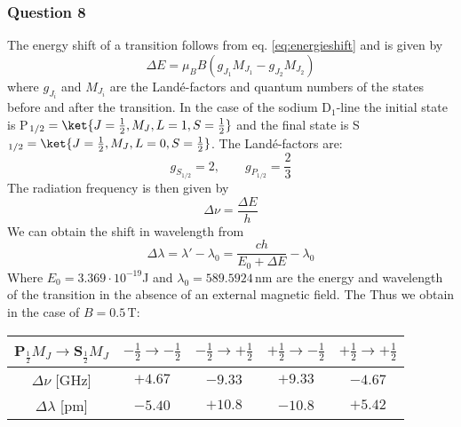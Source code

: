 \subsubsection{Question 8}
The energy shift of a transition follows from eq. \eqref{eq:energieshift} and is given by
\begin{equation}\Delta E=\mu_B B (g_{J_1}M_{J_1} - g_{J_2}M_{J_2}) \end{equation}
where $g_{J_i}$ and $M_{J_i}$ are the Landé-factors and quantum numbers of the states before and  after the transition. In the case of the sodium D$_1$-line the initial state is P$_{1/2}=\ket{J=\frac{1}{2},M_J,L=1,S=\frac{1}{2}}$  and the final state is S$_{1/2}=\ket{J=\frac{1}{2},M_J,L=0,S=\frac{1}{2}}$. The Landé-factors are:
\[g_{S_{1/2}}=2, \qquad g_{P_{1/2}}=\frac{2}{3} \]
The radiation frequency is then given by
\begin{equation}	\Delta\nu=\frac{\Delta E}{h} \end{equation} 
We can obtain the shift in wavelength from
\begin{equation}
	\Delta\lambda=\lambda'-\lambda_0=\frac{ch}{E_0+\Delta E}-\lambda_0
\end{equation}
Where $E_0=3.369\cdot 10^{-19}$J and $\lambda_0=589.5924 \,\si{\nano\metre}$ are the energy and wavelength of the transition in the absence of an external magnetic field.
The Thus we obtain in the case of $B=0.5 \,\si{\tesla}$:
\begin{center}
	\begin{tabular}{ccccc}
		\toprule
		P$_\frac{1}{2} M_J \to $S$_\frac{1}{2} M_J$ & $-\frac{1}{2}\to-\frac{1}{2}$ & $-\frac{1}{2}\to+\frac{1}{2}$& $+\frac{1}{2}\to-\frac{1}{2}$& $+\frac{1}{2}\to+\frac{1}{2}$\\
		\midrule
		$\Delta\nu$ [GHz] & $+4.67$ &$-9.33$ &$+9.33$ &$-4.67$\\
		$\Delta\lambda$ [pm] & $-5.40$& $+10.8$& $-10.8$&$+5.42$\\
		\bottomrule
	\end{tabular}
\end{center}
